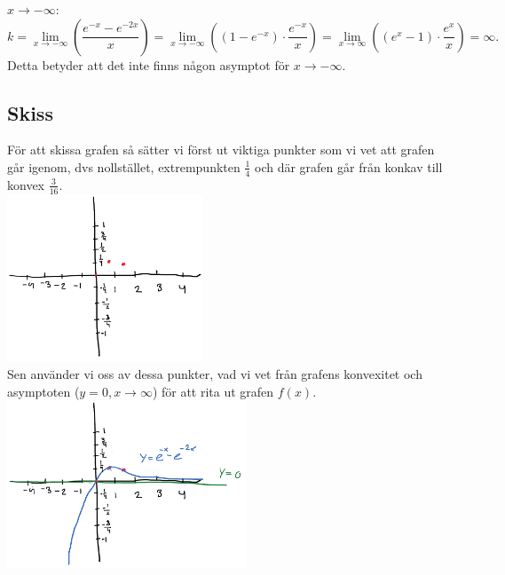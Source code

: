 \documentclass[11pt]{article}
\begin{document}
$x\to-\infty$:
$$k = \lim_{x\to -\infty}(\frac{e^{-x} -e^{-2x}}{x}) = \lim_{x\to -\infty}((1- e^{-x}) \cdot \frac{e^{-x}}{x}) = \lim_{x\to \infty}((e^{x}-1) \cdot \frac{e^{x}}{x}) = \infty.$$
Detta betyder att det inte finns någon asymptot för $x\to-\infty$.
\newpage
\subsection{Skiss}
För att skissa grafen så sätter vi först ut viktiga punkter som vi vet att grafen går igenom, dvs nollstället, extrempunkten $\frac{1}{4}$ och där grafen går från konkav till konvex $\frac{3}{16}$.\\

\includegraphics[height=5cm]{skiss1}\\
Sen använder vi oss av dessa punkter, vad vi vet från grafens konvexitet och asymptoten ($y=0, x\to\infty$) för att rita ut grafen $f(x)$. \\
\includegraphics[height=5cm]{skiss2}
\end{document}
